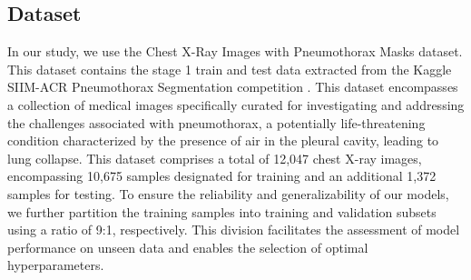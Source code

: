 \subsection{Dataset}
\label{subsec:dataset}
In our study, we use the Chest X-Ray Images with Pneumothorax Masks dataset. This dataset contains the stage 1 train and test data extracted from the Kaggle SIIM-ACR Pneumothorax Segmentation competition \cite{pneumothorax}. This dataset encompasses a collection of medical images specifically curated for investigating and addressing the challenges associated with pneumothorax, a potentially life-threatening condition characterized by the presence of air in the pleural cavity, leading to lung collapse. This dataset comprises a total of 12,047 chest X-ray images, encompassing 10,675 samples designated for training and an additional 1,372 samples for testing. To ensure the reliability and generalizability of our models, we further partition the training samples into training and validation subsets using a ratio of 9:1, respectively. This division facilitates the assessment of model performance on unseen data and enables the selection of optimal hyperparameters.
